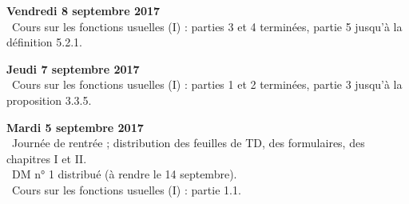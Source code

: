 \documentclass[12pt,a4paper]{article}
\begin{document}
\noindent\textbf{Vendredi 8 septembre 2017}\\
\bu\ Cours sur les fonctions usuelles (I) : parties 3 et 4 terminées, partie 5 jusqu'à la définition 5.2.1. \\
\vspace{.4cm}

\noindent\textbf{Jeudi 7 septembre 2017}\\
\bu\ Cours sur les fonctions usuelles (I) : parties 1 et 2 terminées, partie 3 jusqu'à la proposition 3.3.5. \\
\vspace{.4cm}

\noindent\textbf{Mardi 5 septembre 2017}\\
\bu\ Journée de rentrée ; distribution des feuilles de TD, des formulaires, des
chapitres I et II.  \\
\bu\ DM n° 1 distribué (à rendre le 14 septembre). \\
\bu\ Cours sur les fonctions usuelles (I) : partie 1.1. \\
\vspace{.4cm}


\label{end}
\end{document}
